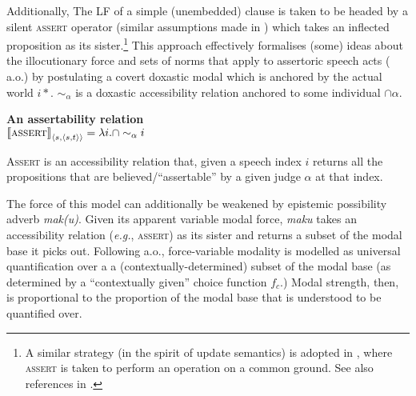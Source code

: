 Additionally, The LF of a simple (unembedded) clause is taken to be headed by a silent \textsc{assert} operator (similar assumptions made in \citealt{Hacquard2010,AlonsoBenito2015,Kaufmann2005}) which takes an inflected proposition as its sister.\footnote{A similar strategy (in the spirit of update semantics) is adopted in \citealt[570]{Krifka2016}, where \textsc{assert} is taken to perform an operation on a common ground. See also references in \citealt[102]{Hacquard2010}.} This approach effectively formalises (some) ideas about the illocutionary force and sets of norms that apply to assertoric speech acts (\citealp[e.g.][]{Williamson1996,Brandom1983} a.o.) by postulating a covert doxastic modal which is anchored by the actual world $ i* $. $ \sim_\alpha $ is a doxastic accessibility relation anchored to some individual $\cap\alpha $.

\pex \textbf{An assertability relation}\\
$ \llbracket{\textsc{assert}}\rrbracket^{}_{\langle s,\langle s,t\rangle\rangle}
=\lambda i.\cap\sim_\alpha i $

\textsc{\textsc{Assert}} is an accessibility relation that, given a speech index $ i $ returns all the propositions that are believed/``assertable'' by a given judge $ \alpha $ at that index.
\xe%

The force of this model can additionally be weakened by epistemic possibility adverb \textit{mak(u)}. Given its apparent variable modal force, \textit{maku} takes an accessibility relation (\textit{e.g.}, \textsc{assert}) as its sister and returns a subset of the modal base it picks out.  Following \citealt{Matthewson2010,Rullmann2008} a.o., force-variable modality is modelled as universal quantification over a a (contextually-determined) subset of the modal base (as determined by a ``contextually given'' choice function $ f_c $.) Modal strength, then, is proportional to the proportion of the modal base that is understood to be quantified over.


